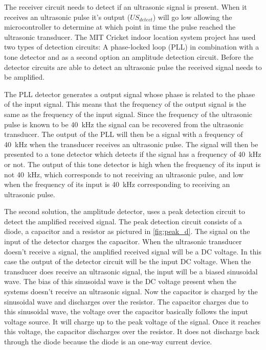 The receiver circuit needs to detect if an ultrasonic signal is present.
When it receives an ultrasonic pulse it's output ($US_{detect}$) will go low allowing the microcontroller to determine at which point in time the pulse reached the ultrasonic transducer.
The MIT Cricket indoor location system \cite{Balakrishnan2003, Priyantha2000} project has used two types of detection circuits: A phase-locked loop (PLL) in combination with a tone detector and as a second option an amplitude detection circuit.
Before the detector circuits are able to detect an ultrasonic pulse the received signal needs to be amplified.

The PLL detector generates a output signal whose phase is related to the phase of the input signal.
This means that the frequency of the output signal is the same as the frequency of the input signal.
Since the frequency of the ultrasonic pulse is known to be \SI{40}{\kilo\hertz}
the signal can be recovered from the ultrasonic transducer.
The output of the PLL will then be a signal with a frequency of \SI{40}{\kilo\hertz} when the transducer receives an ultrasonic pulse.
The signal will then be presented to a tone detector which detects if the signal has a frequency of \SI{40}{\kilo\hertz} or not.
The output of this tone detector is high when the frequency of its input is not \SI{40}{\kilo\hertz}, which corresponds to not receiving an ultrasonic pulse, and low when the frequency of its input is \SI{40}{\kilo\hertz} corresponding to receiving an ultrasonic pulse.

The second solution, the amplitude detector, uses a peak detection circuit to detect the amplified received signal.
The peak detection circuit consists of a diode, a capacitor and a resistor as pictured in \ref{fig:peak_d}.
The signal on the input of the detector charges the capacitor.
When the ultrasonic transducer doesn't receive a signal, the amplified received signal will be a DC voltage.
In this case the output of the detector circuit will be the input DC voltage.
When the transducer does receive an ultrasonic signal, the input will be a biased sinusoidal wave.
The bias of this sinusoidal wave is the DC voltage present when the systems doesn't receive an ultrasonic signal.
Now the capacitor is charged by the sinusoidal wave and discharges over the resistor.
The capacitor charges due to this sinusoidal wave, the voltage over the capacitor basically follows the input voltage source.
It will charge up to the peak voltage of the signal. Once it reaches this voltage, the capacitor discharges over the resistor.
It does not discharge back through the diode because the diode is an one-way current device.

